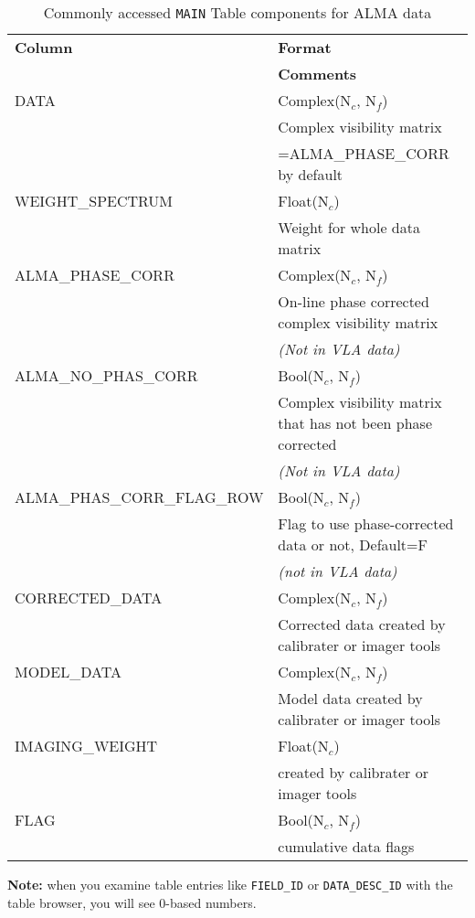 \vspace{5mm}
\begin{table}[hb]
\caption[Commonly accessed {\tt MAIN} Table components for ALMA data]
        {\label{tabmain}Commonly accessed {\tt MAIN} Table components for ALMA data}
\begin{center}
\begin{tabular}{|ll|} \hline
  {\bf Column}      &  {\bf Format}        \\         
                    &  {\bf Comments}      \\        
  DATA              &  Complex(N$_c$, N$_f$)  \\       
                    &  Complex visibility matrix  \\
                    &  =ALMA\_PHASE\_CORR by default  \\
  WEIGHT\_SPECTRUM   &  Float(N$_c$)    \\            
                    &  Weight for whole data matrix \\     
  ALMA\_PHASE\_CORR   &  Complex(N$_c$, N$_f$) \\        
                    &  On-line phase corrected complex visibility matrix  \\
                    &  {\it (Not in VLA data)}  \\
  ALMA\_NO\_PHAS\_CORR  &  Bool(N$_c$, N$_f$)    \\     
                     & Complex visibility matrix that has not been phase corrected  \\
                     & {\it (Not in VLA data)}  \\
  ALMA\_PHAS\_CORR\_FLAG\_ROW  &  Bool(N$_c$, N$_f$)  \\
                           &  Flag to use phase-corrected data or not, Default=F  \\
                           &  {\it (not in VLA data)} \\    
  CORRECTED\_DATA   &  Complex(N$_c$, N$_f$)  \\     
                   &  Corrected data created by calibrater or imager tools \\ 
  MODEL\_DATA       &  Complex(N$_c$, N$_f$)      \\ 
                   &  Model data created by calibrater or imager tools  \\
  IMAGING\_WEIGHT   &  Float(N$_c$)  \\
                   &  created by calibrater or imager tools  \\
  FLAG             &  Bool(N$_c$, N$_f$) \\
                   &  cumulative data flags    \\
\hline
\end{tabular}
\end{center}
\end{table}
{\bf Note:} when you examine table entries like {\tt FIELD\_ID} or 
{\tt DATA\_DESC\_ID} with the table browser, you will see 0-based numbers.

